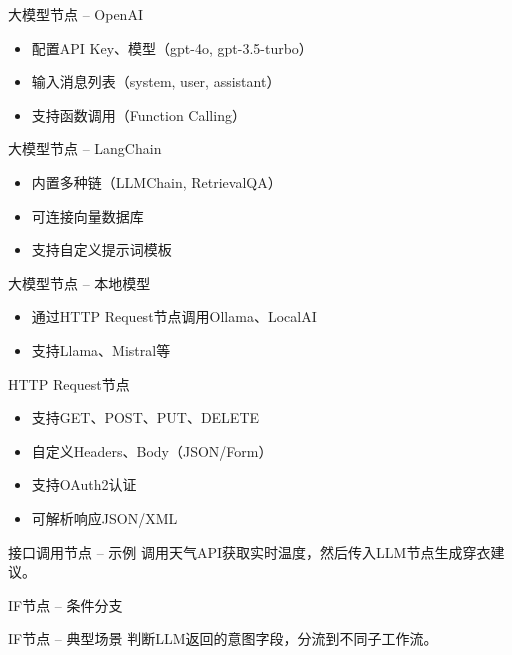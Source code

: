 \begin{frame}{大模型节点 – OpenAI}
\begin{itemize}
\item 配置API Key、模型（gpt-4o, gpt-3.5-turbo）
\item 输入消息列表（system, user, assistant）
\item 支持函数调用（Function Calling）
\end{itemize}
\end{frame}
\begin{frame}{大模型节点 – LangChain}
\begin{itemize}
\item 内置多种链（LLMChain, RetrievalQA）
\item 可连接向量数据库
\item 支持自定义提示词模板
\end{itemize}
\end{frame}
\begin{frame}{大模型节点 – 本地模型}
\begin{itemize}
\item 通过HTTP Request节点调用Ollama、LocalAI
\item 支持Llama、Mistral等
\end{itemize}
\end{frame}

\begin{frame}{HTTP Request节点}
\begin{itemize}
\item 支持GET、POST、PUT、DELETE
\item 自定义Headers、Body（JSON/Form）
\item 支持OAuth2认证
\item 可解析响应JSON/XML
\end{itemize}
\end{frame}
\begin{frame}{接口调用节点 – 示例}
调用天气API获取实时温度，然后传入LLM节点生成穿衣建议。
\end{frame}

\begin{frame}{IF节点 – 条件分支}
\end{frame}
\begin{frame}{IF节点 – 典型场景}
判断LLM返回的意图字段，分流到不同子工作流。
\end{frame}

